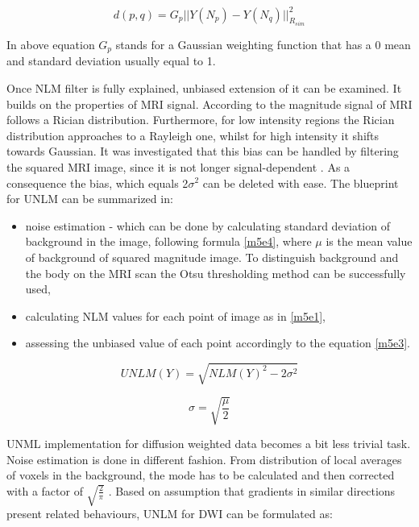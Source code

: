 \begin{equation}
d(p,q) = G_{p}||Y(N_{p}) - Y(N_{q})||^{2}_{R_{sim}}
\label{m5e6}
\end{equation}

In above equation $G_p$ stands for a Gaussian weighting function that has a 0 mean and standard deviation usually equal to 1.

Once NLM filter is fully explained, unbiased extension of it can be examined. It builds on the properties of MRI signal. According to \cite{5a1} the magnitude signal of MRI follows a Rician distribution. Furthermore, for low intensity regions the Rician distribution approaches to a Rayleigh one, whilst for high intensity it shifts towards Gaussian. It was investigated that this bias can be handled by filtering the squared MRI image, since it is not longer signal-dependent \cite{5a1}. As a consequence the bias, which equals 2$\sigma^2$ \cite{5a3} can be deleted with ease. The blueprint for UNLM can be summarized in:

\begin{itemize}
	\item noise estimation - which can be done by calculating standard deviation of background in the image, following formula \ref{m5e4}, where $\mu$ is the mean value of background of squared magnitude image. To distinguish background and the body on the MRI scan the Otsu thresholding method \cite{5a4} can be successfully used,  
	\item calculating NLM values for each point of image as in \ref{m5e1},
	\item assessing the unbiased value of each point accordingly to the equation \ref{m5e3}.
	
\end{itemize}

\begin{equation}
UNLM(Y) = \sqrt{NLM(Y)^2 - 2\sigma^2}
\label{m5e3}
\end{equation}

\begin{equation}
\sigma = \sqrt{\frac{\mu}{2}}
\label{m5e4}
\end{equation}

UNML implementation for diffusion weighted data becomes a bit less trivial task. Noise estimation is done in different fashion. From distribution of local averages of voxels in the background, the mode has to be calculated and then corrected with a factor of $\sqrt{\frac{2}{\pi}}$ \cite{5a2}. Based on assumption that gradients in similar directions present related behaviours, UNLM for DWI can be formulated as:

